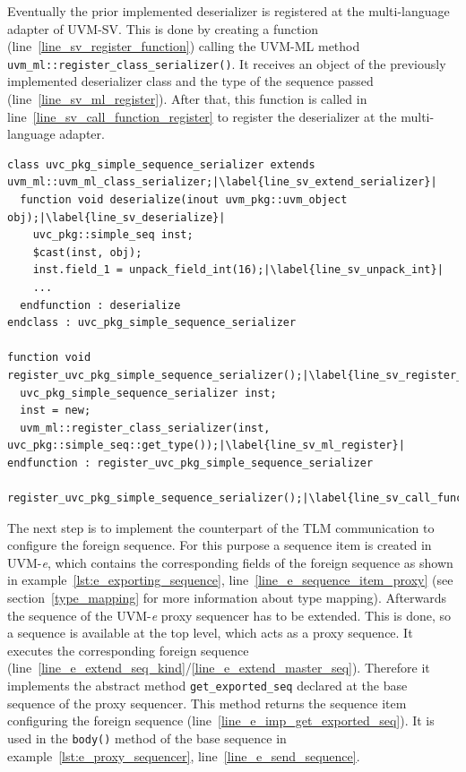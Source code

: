 Eventually the prior implemented deserializer is registered at the multi-language adapter of UVM-SV. This is done by creating a function (line~\ref{line_sv_register_function}) calling the UVM-ML method \lstinline$uvm_ml::register_class_serializer()$. It receives an object of the previously implemented deserializer class and the type of the sequence passed (line~\ref{line_sv_ml_register}). After that, this function is called in line~\ref{line_sv_call_function_register} to register the deserializer at the multi-language adapter.
\lstset{language=SystemVerilog, numbers = left, escapechar=|, breaklines=true}
\begin{lstlisting}[frame=htrbl, caption={SystemVerilog: deserializer for foreign sequences},
label={lst:SV_deserializer_sequence}]
class uvc_pkg_simple_sequence_serializer extends uvm_ml::uvm_ml_class_serializer;|\label{line_sv_extend_serializer}|
  function void deserialize(inout uvm_pkg::uvm_object obj);|\label{line_sv_deserialize}|
    uvc_pkg::simple_seq inst;
    $cast(inst, obj);
    inst.field_1 = unpack_field_int(16);|\label{line_sv_unpack_int}|
    ...
  endfunction : deserialize
endclass : uvc_pkg_simple_sequence_serializer

function void register_uvc_pkg_simple_sequence_serializer();|\label{line_sv_register_function}|
  uvc_pkg_simple_sequence_serializer inst;
  inst = new;
  uvm_ml::register_class_serializer(inst, uvc_pkg::simple_seq::get_type());|\label{line_sv_ml_register}|
endfunction : register_uvc_pkg_simple_sequence_serializer

register_uvc_pkg_simple_sequence_serializer();|\label{line_sv_call_function_register}|
\end{lstlisting}
The next step is to implement the counterpart of the TLM communication to configure the foreign sequence. For this purpose a sequence item is created in UVM-\textit{e}, which contains the corresponding fields of the foreign sequence as shown in example~\ref{lst:e_exporting_sequence}, line~\ref{line_e_sequence_item_proxy} (see section~\ref{type_mapping} for more information about type mapping). Afterwards the sequence of the UVM-\textit{e} proxy sequencer has to be extended. This is done, so a sequence is available at the top level, which acts as a proxy sequence. It executes the corresponding foreign sequence (line~\ref{line_e_extend_seq_kind}/\ref{line_e_extend_master_seq}). Therefore it implements the abstract method \lstinline$get_exported_seq$ declared at the base sequence of the proxy sequencer. This method returns the sequence item configuring the foreign sequence (line~\ref{line_e_imp_get_exported_seq}). It is used in the \lstinline$body()$ method of the base sequence in example~\ref{lst:e_proxy_sequencer}, line~\ref{line_e_send_sequence}.\\
